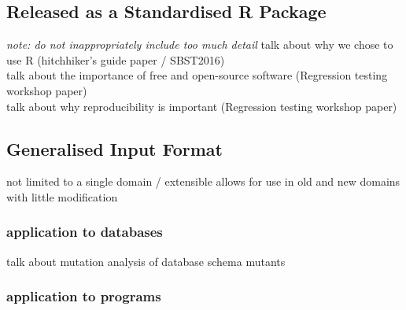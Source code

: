 \subsection{Released as a Standardised R Package}
\textit{note: do not inappropriately include too much detail}
talk about why we chose to use R (hitchhiker's guide paper / SBST2016)\\
talk about the importance of free and open-source software (Regression testing workshop paper)\\
talk about why reproducibility is important (Regression testing workshop paper)


\subsection{Generalised Input Format}
not limited to a single domain / extensible
allows for use in old and new domains with little modification
    \subsubsection{application to databases}
    talk about mutation analysis of database schema mutants
    \subsubsection{application to programs}

